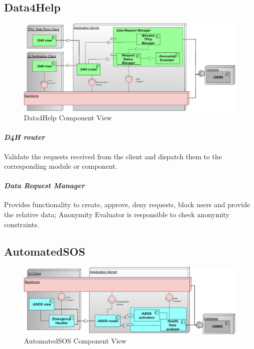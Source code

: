 \subsection{Data4Help}
\begin{figure}[H]
\caption{Data4Help Component View}
\includegraphics[width = \textwidth]{sections/architecturalDesign/D4HDiagram.png}
\end{figure}
\paragraph{\textit{D4H router}} Validate the requests received from the client and dispatch them to the corresponding module or component.
\paragraph{\textit{Data Request Manager}} Provides functionality to create, approve, deny requests, block users and provide the relative data; Anonymity Evaluator is responsible to check anonymity constraints. 
\clearpage
\subsection{AutomatedSOS}
\begin{figure}[H]
 \caption{AutomatedSOS Component View}
\centering
\includegraphics[width = \textwidth]{sections/architecturalDesign/ASOSDiagram.png}
\end{figure}
